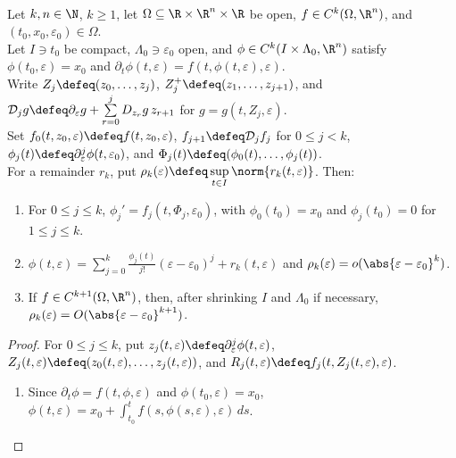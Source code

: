 \begin{proposition} \label{prop:regular-perturbation-taylor-recursion} \\
Let $k,n\in\N$, $k\geq1$, let $\Omega\subseteq\R\times\R^n\times\R$ be open, $f\in C^k(\Omega,\R^n)$, and $(t_0,x_0,\varepsilon_0)\in\Omega$.\\
Let $I\ni t_0$ be compact, $\Lambda_0\ni\varepsilon_0$ open, and $\phi\in C^k(I\times\Lambda_0,\R^n)$ satisfy $\phi(t_0,\varepsilon)=x_0$ and $\partial_t\phi(t,\varepsilon)=f(t,\phi(t,\varepsilon),\varepsilon)$.\\
Write $Z_j\defeq(z_0,\ldots,z_j)$, $Z_j^+\defeq(z_1,\ldots,z_{j+1})$, and $\mathcal D_j g\defeq\partial_\varepsilon g+\sum\limits_{r=0}^jD_{z_r}g\,z_{r+1}$ for $g=g(t,Z_j,\varepsilon)$.\\
Set $f_0(t,z_0,\varepsilon)\defeq f(t,z_0,\varepsilon)$, $f_{j+1}\defeq\mathcal D_j f_j$ for $0\leq j<k$, $\phi_j(t)\defeq\partial_\varepsilon^j\phi(t,\varepsilon_0)$, and $\Phi_j(t)\defeq(\phi_0(t),\ldots,\phi_j(t))$.\\
For a remainder $r_k$, put $\rho_k(\varepsilon)\defeq\sup\limits_{t\in I}\norm{r_k(t,\varepsilon)}$. Then:
\begin{enumerate}[label=(\roman*)]
\setlength{\itemsep}{0pt}
\item For $0\leq j\leq k$, $\phi_j'=f_j(t,\Phi_j,\varepsilon_0)$, with $\phi_0(t_0)=x_0$ and $\phi_j(t_0)=0$ for $1\leq j\leq k$.
\item $\phi(t,\varepsilon)=\sum\limits_{j=0}^k\frac{\phi_j(t)}{j!}(\varepsilon-\varepsilon_0)^j+r_k(t,\varepsilon)$ and $\rho_k(\varepsilon)=o(\abs{\varepsilon-\varepsilon_0}^k)$.
\item If $f\in C^{k+1}(\Omega,\R^n)$, then, after shrinking $I$ and $\Lambda_0$ if necessary, $\rho_k(\varepsilon)=O(\abs{\varepsilon-\varepsilon_0}^{k+1})$.
\end{enumerate}
\begin{proof}
For $0\leq j\leq k$, put $z_j(t,\varepsilon)\defeq\partial_\varepsilon^j\phi(t,\varepsilon)$, $Z_j(t,\varepsilon)\defeq(z_0(t,\varepsilon),\ldots,z_j(t,\varepsilon))$, and $R_j(t,\varepsilon)\defeq f_j(t,Z_j(t,\varepsilon),\varepsilon)$.
\begin{enumerate}[label=(\roman*)]
\setlength{\itemsep}{0pt}
\item Since $\partial_t\phi=f(t,\phi,\varepsilon)$ and $\phi(t_0,\varepsilon)=x_0$, $\phi(t,\varepsilon)=x_0+\int_{t_0}^tf(s,\phi(s,\varepsilon),\varepsilon)\,ds$.\\

\end{enumerate}
\end{proof}
\end{proposition}
